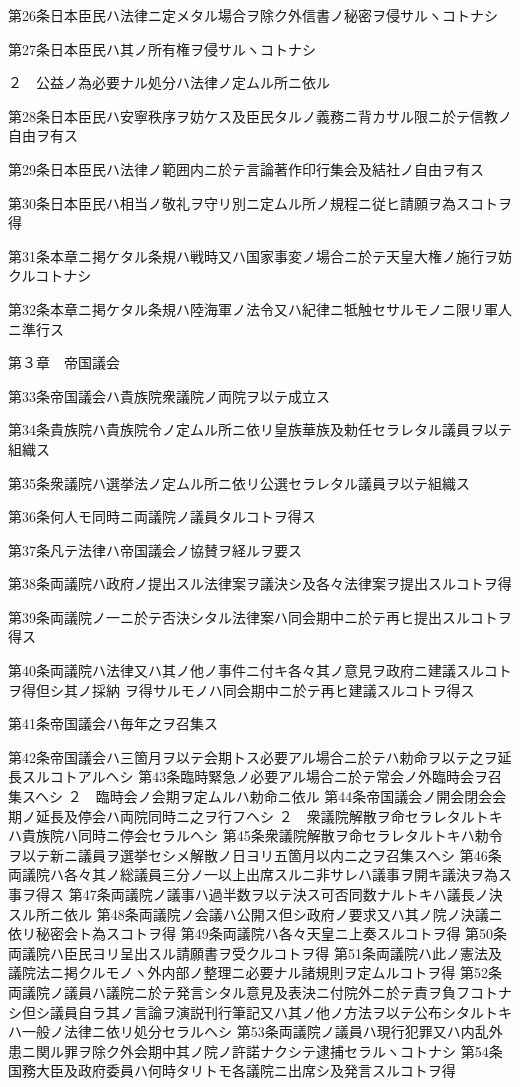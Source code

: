 第26条日本臣民ハ法律ニ定メタル場合ヲ除ク外信書ノ秘密ヲ侵サルヽコトナシ

第27条日本臣民ハ其ノ所有権ヲ侵サルヽコトナシ

２　公益ノ為必要ナル処分ハ法律ノ定ムル所ニ依ル

第28条日本臣民ハ安寧秩序ヲ妨ケス及臣民タルノ義務ニ背カサル限ニ於テ信教ノ自由ヲ有ス

第29条日本臣民ハ法律ノ範囲内ニ於テ言論著作印行集会及結社ノ自由ヲ有ス

第30条日本臣民ハ相当ノ敬礼ヲ守リ別ニ定ムル所ノ規程ニ従ヒ請願ヲ為スコトヲ得

第31条本章ニ掲ケタル条規ハ戦時又ハ国家事変ノ場合ニ於テ天皇大権ノ施行ヲ妨クルコトナシ

第32条本章ニ掲ケタル条規ハ陸海軍ノ法令又ハ紀律ニ牴触セサルモノニ限リ軍人ニ準行ス


第３章　帝国議会

第33条帝国議会ハ貴族院衆議院ノ両院ヲ以テ成立ス

第34条貴族院ハ貴族院令ノ定ムル所ニ依リ皇族華族及勅任セラレタル議員ヲ以テ組織ス

第35条衆議院ハ選挙法ノ定ムル所ニ依リ公選セラレタル議員ヲ以テ組織ス

第36条何人モ同時ニ両議院ノ議員タルコトヲ得ス

第37条凡テ法律ハ帝国議会ノ協賛ヲ経ルヲ要ス

第38条両議院ハ政府ノ提出スル法律案ヲ議決シ及各々法律案ヲ提出スルコトヲ得

第39条両議院ノ一ニ於テ否決シタル法律案ハ同会期中ニ於テ再ヒ提出スルコトヲ得ス

第40条両議院ハ法律又ハ其ノ他ノ事件ニ付キ各々其ノ意見ヲ政府ニ建議スルコトヲ得但シ其ノ採納
ヲ得サルモノハ同会期中ニ於テ再ヒ建議スルコトヲ得ス

第41条帝国議会ハ毎年之ヲ召集ス

第42条帝国議会ハ三箇月ヲ以テ会期トス必要アル場合ニ於テハ勅命ヲ以テ之ヲ延長スルコトアルヘシ
第43条臨時緊急ノ必要アル場合ニ於テ常会ノ外臨時会ヲ召集スヘシ
２　臨時会ノ会期ヲ定ムルハ勅命ニ依ル
第44条帝国議会ノ開会閉会会期ノ延長及停会ハ両院同時ニ之ヲ行フヘシ
２　衆議院解散ヲ命セラレタルトキハ貴族院ハ同時ニ停会セラルヘシ
第45条衆議院解散ヲ命セラレタルトキハ勅令ヲ以テ新ニ議員ヲ選挙セシメ解散ノ日ヨリ五箇月以内ニ之ヲ召集スヘシ
第46条両議院ハ各々其ノ総議員三分ノ一以上出席スルニ非サレハ議事ヲ開キ議決ヲ為ス事ヲ得ス
第47条両議院ノ議事ハ過半数ヲ以テ決ス可否同数ナルトキハ議長ノ決スル所ニ依ル
第48条両議院ノ会議ハ公開ス但シ政府ノ要求又ハ其ノ院ノ決議ニ依リ秘密会ト為スコトヲ得
第49条両議院ハ各々天皇ニ上奏スルコトヲ得
第50条両議院ハ臣民ヨリ呈出スル請願書ヲ受クルコトヲ得
第51条両議院ハ此ノ憲法及議院法ニ掲クルモノヽ外内部ノ整理ニ必要ナル諸規則ヲ定ムルコトヲ得
第52条両議院ノ議員ハ議院ニ於テ発言シタル意見及表決ニ付院外ニ於テ責ヲ負フコトナシ但シ議員自ラ其ノ言論ヲ演説刊行筆記又ハ其ノ他ノ方法ヲ以テ公布シタルトキハ一般ノ法律ニ依リ処分セラルヘシ
第53条両議院ノ議員ハ現行犯罪又ハ内乱外患ニ関ル罪ヲ除ク外会期中其ノ院ノ許諾ナクシテ逮捕セラルヽコトナシ
第54条国務大臣及政府委員ハ何時タリトモ各議院ニ出席シ及発言スルコトヲ得



